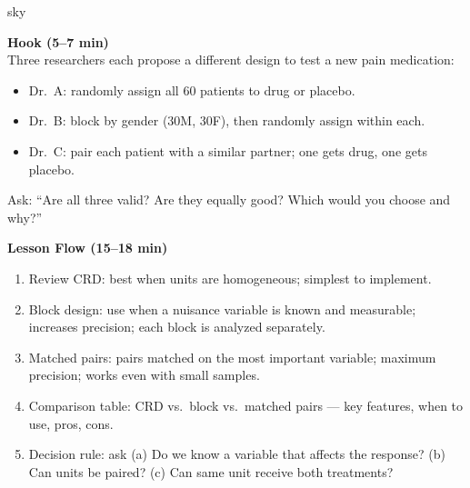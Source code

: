 \documentclass[10pt]{article}
\begin{document}
\begin{skillbox}{sky}
\begin{minipage}[t]{0.48\linewidth}
    \textbf{Hook (5--7 min)}\\
    Three researchers each propose a different design to test a new pain medication:
    \begin{itemize}
        \item Dr.\ A: randomly assign all 60 patients to drug or placebo.
        \item Dr.\ B: block by gender (30M, 30F), then randomly assign within each.
        \item Dr.\ C: pair each patient with a similar partner; one gets drug, one
              gets placebo.
    \end{itemize}
    Ask: ``Are all three valid? Are they equally good? Which would you choose and
    why?''
\end{minipage}
\hfill
\begin{minipage}[t]{0.48\linewidth}
    \textbf{Lesson Flow (15--18 min)}
    \begin{enumerate}
        \item Review CRD: best when units are homogeneous; simplest to implement.
        \item Block design: use when a nuisance variable is known and measurable;
              increases precision; each block is analyzed separately.
        \item Matched pairs: pairs matched on the most important variable; maximum
              precision; works even with small samples.
        \item Comparison table: CRD vs.\ block vs.\ matched pairs --- key features,
              when to use, pros, cons.
        \item Decision rule: ask (a) Do we know a variable that affects the response?
              (b) Can units be paired? (c) Can same unit receive both treatments?
    \end{enumerate}
\end{minipage}
\end{skillbox}
\end{document}
